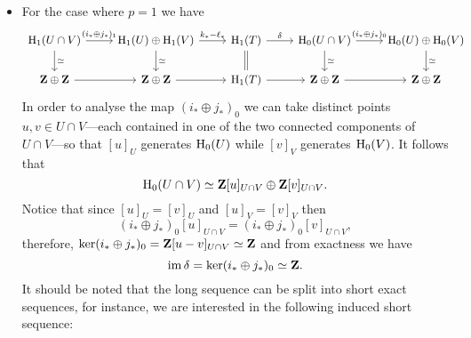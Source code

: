 \begin{example}[Torus]
\begin{enumerate}[(a)]
\begin{itemize}
                  \item For the case where \(p = 1\) we have {\small
                                \[
                                    \begin{tikzcd}
                                        \Hmlg_1(U \cap V) \ar[r, "{(i_{*} \oplus j_*)_1}"] \ar[d, "\dis"]
                                        &{\Hmlg_1(U) \oplus \Hmlg_1(V)} \ar[r, "{k_{*} - \ell_{*}}"] \ar[d, "\dis"]
                                        &\Hmlg_1(T) \ar[r, "\delta"] \ar[d, equals]
                                        &\Hmlg_0(U \cap V) \ar[r, "{(i_* \oplus j_{*})_0}"] \ar[d, "\dis"]
                                        &\Hmlg_0(U) \oplus \Hmlg_0(V) \ar[d, "\dis"]
                                        \\
                                        \Z \oplus \Z \ar[r]
                                        &\Z \oplus \Z \ar[r]
                                        &\Hmlg_1(T) \ar[r]
                                        &\Z \oplus \Z \ar[r]
                                        &\Z \oplus \Z
                                    \end{tikzcd}
                                \]
                            } In order to analyse the map \((i_* \oplus j_{*})_0\) we can take distinct points
                        \(u, v \in U \cap V\)---each contained in one of the two connected components of
                        \(U \cap V\)---so that \([u]_U\) generates \(\operatorname{H}_0(U)\) while \([v]_V\) generates
                        \(\operatorname{H}_0(V)\). It follows that
                        \[
                            \operatorname{H}_0(U \cap V) \simeq \mathbf{Z} [u]_{U \cap V} \oplus \mathbf{Z} [v]_{U \cap V}.
                        \]
                        Notice that since \([u]_U = [v]_U\) and \([u]_V = [v]_V\) then
                        \[
                            (i_{*} \oplus j_{*})_0 [u]_{U \cap V} = (i_{*} \oplus j_{*})_0 [v]_{U \cap V},
                        \]
                        therefore, \(\ker(i_{*} \oplus j_{*})_0 = \mathbf{Z}[u - v]_{U \cap V} \simeq \mathbf{Z}\) and from
                        exactness we have
                        \[
                            \operatorname{im} \delta = \ker(i_{*} \oplus j_{*})_0 \simeq \mathbf{Z}.
                        \]
                        It should be noted that the long sequence can be split into short exact
                        sequences, for instance, we are interested in the following induced short
                        sequence:
                        \[
                            \begin{tikzcd}

\end{tikzcd}\]
\end{itemize}
\end{enumerate}
\end{example}
